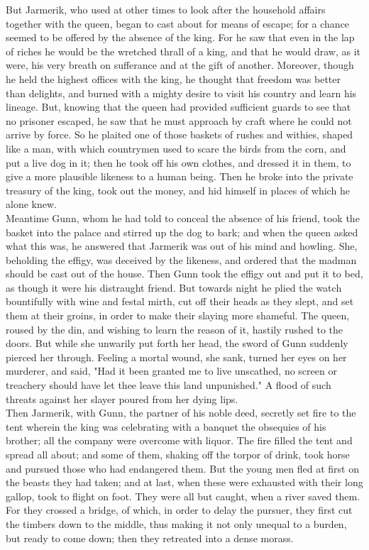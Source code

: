 \documentclass[10pt,a4paper]{report}
\begin{document}
But Jarmerik, who used at other times to look after the household affairs together with the queen, began to cast about for means of escape; for a chance seemed to be offered by the absence of the king. For he saw that even in the lap of riches he would be the wretched thrall of a king, and that he would draw, as it were, his very breath on sufferance and at the gift of another. Moreover, though he held the highest offices with the king, he thought that freedom was better than delights, and burned with a mighty desire to visit his country and learn his lineage. But, knowing that the queen had provided sufficient guards to see that no prisoner escaped, he saw that he must approach by craft where he could not arrive by force. So he plaited one of those baskets of rushes and withies, shaped like a man, with which countrymen used to scare the birds from the corn, and put a live dog in it; then he took off his own clothes, and dressed it in them, to give a more plausible likeness to a human being. Then he broke into the private treasury of the king, took out the money, and hid himself in places of which he alone knew.\\

Meantime Gunn, whom he had told to conceal the absence of his friend, took the basket into the palace and stirred up the dog to bark; and when the queen asked what this was, he answered that Jarmerik was out of his mind and howling. She, beholding the effigy, was deceived by the likeness, and ordered that the madman should be cast out of the house. Then Gunn took the effigy out and put it to bed, as though it were his distraught friend. But towards night he plied the watch bountifully with wine and festal mirth, cut off their heads as they slept, and set them at their groins, in order to make their slaying more shameful. The queen, roused by the din, and wishing to learn the reason of it, hastily rushed to the doors. But while she unwarily put forth her head, the sword of Gunn suddenly pierced her through. Feeling a mortal wound, she sank, turned her eyes on her murderer, and said, "Had it been granted me to live unscathed, no screen or treachery should have let thee leave this land unpunished." A flood of such threats against her slayer poured from her dying lips.\\

Then Jarmerik, with Gunn, the partner of his noble deed, secretly set fire to the tent wherein the king was celebrating with a banquet the obsequies of his brother; all the company were overcome with liquor. The fire filled the tent and spread all about; and some of them, shaking off the torpor of drink, took horse and pursued those who had endangered them. But the young men fled at first on the beasts they had taken; and at last, when these were exhausted with their long gallop, took to flight on foot. They were all but caught, when a river saved them. For they crossed a bridge, of which, in order to delay the pursuer, they first cut the timbers down to the middle, thus making it not only unequal to a burden, but ready to come down; then they retreated into a dense morass.\\
\end{document}
